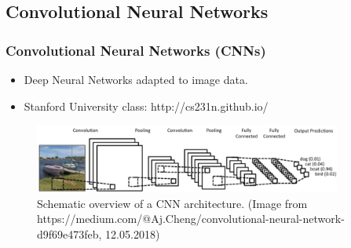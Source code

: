 \documentclass[aspectratio=43, notes]{beamer} 	%
\begin{document}
\subsection{Convolutional Neural Networks}
\begin{frame}
	\frametitle<presentation>{Convolutional Neural Networks (CNNs)}
	\begin{itemize}
		\item Deep Neural Networks adapted to image data.
		\item Stanford University class: http://cs231n.github.io/ 
	\end{itemize}
	\begin{figure}[!t]
	\centering
		\includegraphics[width=0.9\textwidth]{bilder/cnn_overview.png}
	\caption{Schematic overview of a CNN architecture. \hspace{\textwidth}
		\tiny (Image from https://medium.com/@Aj.Cheng/convolutional-neural-network-d9f69e473feb, 12.05.2018)}
	\label{fig:cnn_overview}
	\end{figure}
\end{frame}
\end{document}
